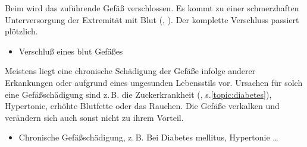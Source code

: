 {%
Beim  wird das
zuführende Gefäß verschlossen. Es kommt zu einer schmerzhaften 
Unterversorgung der Extremität mit Blut
(,
). Der komplette Verschluss passiert plötzlich. }
{
\begin{itemize}
    \item Verschluß eines blut Gefäßes
\end{itemize}
}{}{}{}

{%
Meistens liegt eine 
chronische Schädigung der
Gefäße infolge anderer Erkankungen oder aufgrund eines
ungesunden Lebensstils vor. Ursachen für solch eine
Gefäßschädigung sind z.\,B. die Zuckerkrankheit (, s.\ref{topic:diabetes}), Hypertonie, erhöhte
Blutfette oder das Rauchen. Die Gefäße verkalken und
verändern sich auch sonst nicht zu ihrem Vorteil.
}
{
\begin{itemize}
  \item Chronische Gefäßschädigung, z.\,B. Bei Diabetes mellitus, Hypertonie \ldots
\end{itemize}
}{}{}{}




 


